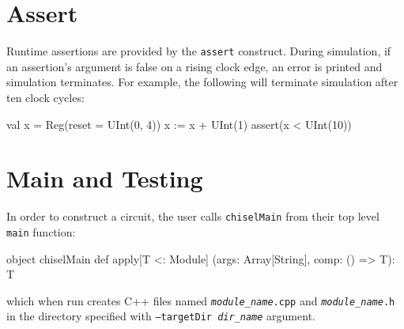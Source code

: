\documentclass[10pt,twocolumn]{article}
\def\code#1{{\small\tt #1}}
\begin{document}
\section{Assert}

Runtime assertions are provided by the \code{assert} construct.  During
simulation, if an assertion's argument is false on a rising clock edge,
an error is printed and simulation terminates.  For example, the following
will terminate simulation after ten clock cycles:

\begin{scala}
val x = Reg(reset = UInt(0, 4))
x := x + UInt(1)
assert(x < UInt(10))
\end{scala}

\section{Main and Testing}

In order to construct a circuit, 
the user calls \code{chiselMain} from their top level \code{main} function:

\begin{scala}
object chiselMain {
  def apply[T <: Module]
    (args: Array[String], comp: () => T): T
}
\end{scala}

\noindent
which when run creates C++ files named
\code{{\it module\_name}.cpp} and \code{{\it module\_name}.h} in
the directory specified with
\code{--targetDir {\it dir\_name}} argument.
\end{document}
